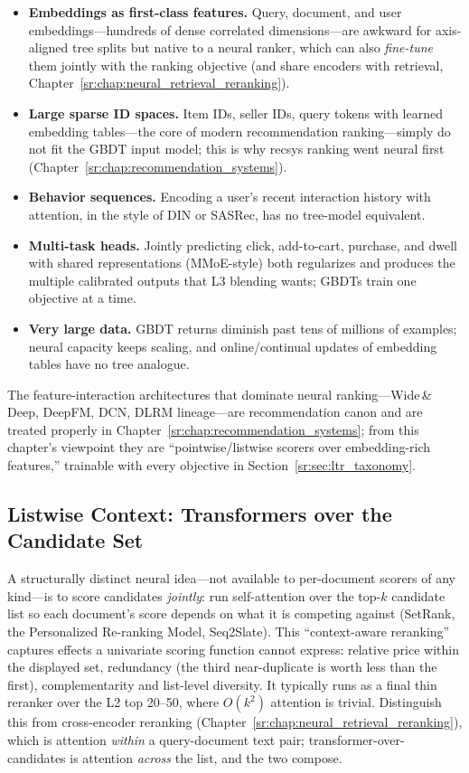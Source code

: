 \begin{itemize}
    \item \textbf{Embeddings as first-class features.} Query, document, and user embeddings---hundreds of dense correlated dimensions---are awkward for axis-aligned tree splits but native to a neural ranker, which can also \textit{fine-tune} them jointly with the ranking objective (and share encoders with retrieval, Chapter~\ref{sr:chap:neural_retrieval_reranking}).
    \item \textbf{Large sparse ID spaces.} Item IDs, seller IDs, query tokens with learned embedding tables---the core of modern recommendation ranking---simply do not fit the GBDT input model; this is why recsys ranking went neural first (Chapter~\ref{sr:chap:recommendation_systems}).
    \item \textbf{Behavior sequences.} Encoding a user's recent interaction history with attention, in the style of DIN or SASRec, has no tree-model equivalent.
    \item \textbf{Multi-task heads.} Jointly predicting click, add-to-cart, purchase, and dwell with shared representations (MMoE-style) both regularizes and produces the multiple calibrated outputs that L3 blending wants; GBDTs train one objective at a time.
    \item \textbf{Very large data.} GBDT returns diminish past tens of millions of examples; neural capacity keeps scaling, and online/continual updates of embedding tables have no tree analogue.
\end{itemize}

The feature-interaction architectures that dominate neural ranking---Wide\,\&\,Deep, DeepFM, DCN, DLRM lineage---are recommendation canon and are treated properly in Chapter~\ref{sr:chap:recommendation_systems}; from this chapter's viewpoint they are ``pointwise/listwise scorers over embedding-rich features,'' trainable with every objective in Section~\ref{sr:sec:ltr_taxonomy}.

\subsection{Listwise Context: Transformers over the Candidate Set}

A structurally distinct neural idea---not available to per-document scorers of any kind---is to score candidates \textit{jointly}: run self-attention over the top-$k$ candidate list so each document's score depends on what it is competing against (SetRank, the Personalized Re-ranking Model, Seq2Slate). This ``context-aware reranking'' captures effects a univariate scoring function cannot express: relative price within the displayed set, redundancy (the third near-duplicate is worth less than the first), complementarity and list-level diversity. It typically runs as a final thin reranker over the L2 top 20--50, where $O(k^2)$ attention is trivial. Distinguish this from cross-encoder reranking (Chapter~\ref{sr:chap:neural_retrieval_reranking}), which is attention \textit{within} a query-document text pair; transformer-over-candidates is attention \textit{across} the list, and the two compose.

